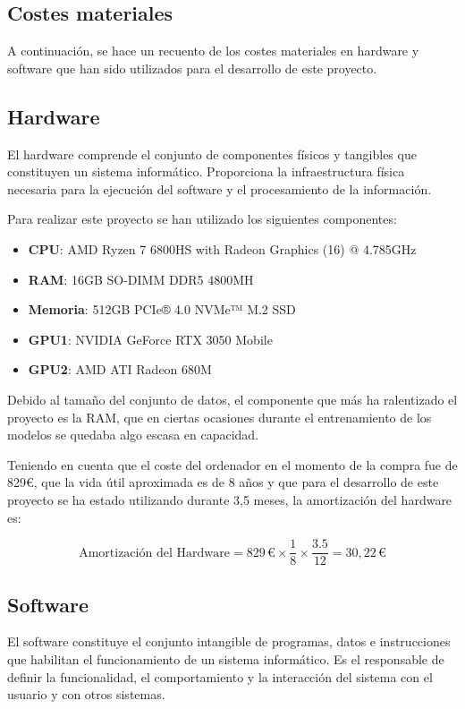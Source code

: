 \subsection{Costes materiales}
A continuación, se hace un recuento de los costes materiales en hardware y software que han sido utilizados para el desarrollo de este proyecto.
\subsection*{Hardware}
El hardware comprende el conjunto de componentes físicos y tangibles que constituyen un sistema informático. Proporciona la infraestructura física necesaria para la ejecución del software y el procesamiento de la información.

Para realizar este proyecto se han utilizado los siguientes componentes:
\begin{itemize}
\item \textbf{CPU}: AMD Ryzen 7 6800HS with Radeon Graphics (16) @ 4.785GHz
\item \textbf{RAM}: 16GB SO-DIMM DDR5 4800MH
\item \textbf{Memoria}: 512GB PCIe® 4.0 NVMe™ M.2 SSD
\item \textbf{GPU1}: NVIDIA GeForce RTX 3050 Mobile 
\item \textbf{GPU2}: AMD ATI Radeon 680M
\end{itemize}

Debido al tamaño del conjunto de datos, el componente que más ha ralentizado el proyecto es la RAM, que en ciertas ocasiones durante el entrenamiento de los modelos se quedaba algo escasa en capacidad.

Teniendo en cuenta que el coste del ordenador en el momento de la compra fue de 829€, que la vida útil aproximada es de 8 años y que para el desarrollo de este proyecto se ha estado utilizando durante 3,5 meses, la amortización del hardware es:

\begin{equation}
	\text{Amortización del Hardware} = 829\,\euro \times \frac{1}{8} \times \frac{3.5}{12} = 30,22\,\euro
\end{equation}

\subsection*{Software}
El software constituye el conjunto intangible de programas, datos e instrucciones que habilitan el funcionamiento de un sistema informático. Es el responsable de definir la funcionalidad, el comportamiento y la interacción del sistema con el usuario y con otros sistemas. 


